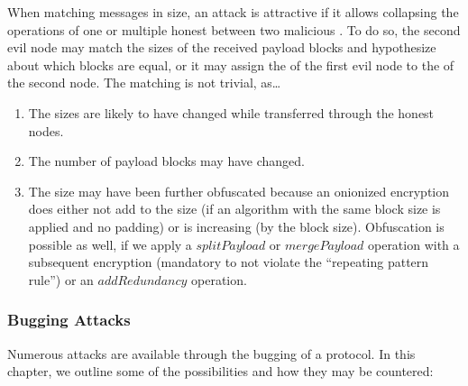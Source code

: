 When matching messages in size, an attack is attractive if it allows collapsing the operations of one or multiple honest \VortexNodes{} between two malicious \VortexNodes. To do so, the second evil node may match the sizes of the received payload blocks and hypothesize about which blocks are equal, or it may assign the  of the first evil node to the  of the second node. The matching is not trivial, as\ldots

\begin{enumerate}
	\item The sizes are likely to have changed while transferred through the honest nodes.
	\item The number of payload blocks may have changed.
	\item The size may have been further obfuscated because an onionized encryption does either not add to the size (if an algorithm with the same block size is applied and no padding) or is increasing (by the block size). Obfuscation is possible as well, if we apply a $splitPayload$ or $mergePayload$ operation with a subsequent encryption (mandatory to not violate the ``repeating pattern rule'') or an $addRedundancy$ operation.
\end{enumerate}

\subsubsection{Bugging Attacks}
Numerous attacks are available through the bugging of a protocol. In this chapter, we outline some of the possibilities and how they may be countered:

